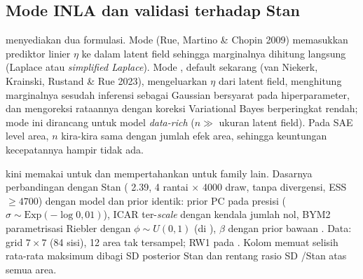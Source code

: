 \subsection{Mode INLA dan validasi terhadap Stan}\label{sec:hbarea-stan}
 menyediakan dua formulasi. Mode  (Rue, Martino \&
Chopin 2009) memasukkan prediktor linier $\eta$ ke dalam latent field sehingga
marginalnya dihitung langsung (Laplace atau \emph{simplified Laplace}). Mode
, default  sekarang (van Niekerk, Krainski, Rustand \&
Rue 2023), mengeluarkan $\eta$ dari latent field, menghitung marginalnya sesudah
inferensi sebagai Gaussian bersyarat pada hiperparameter, dan mengoreksi rataannya
dengan koreksi Variational Bayes berperingkat rendah; mode ini dirancang untuk model
\emph{data-rich} ($n \gg$ ukuran latent field). Pada SAE level area, $n$ kira-kira
sama dengan jumlah efek area, sehingga keuntungan kecepatannya hampir tidak ada.

 kini memakai  untuk  dan mempertahankan  untuk family lain. Dasarnya perbandingan
dengan Stan ( 2.39, 4 rantai $\times$ 4000 draw, tanpa divergensi,
ESS $\ge 4700$) dengan model dan prior identik: prior PC pada presisi
($\sigma \sim \mathrm{Exp}(-\log 0{,}01)$), ICAR ter-\emph{scale} dengan kendala
jumlah nol, BYM2 parametrisasi Riebler dengan $\phi\sim U(0,1)$ (di 
), $\beta$ dengan prior bawaan .
Data: grid $7\times7$ (84 sisi), 12 area tak tersampel; RW1 pada .
Kolom memuat selisih rata-rata maksimum dibagi SD posterior Stan dan rentang
rasio SD /Stan atas semua area.

